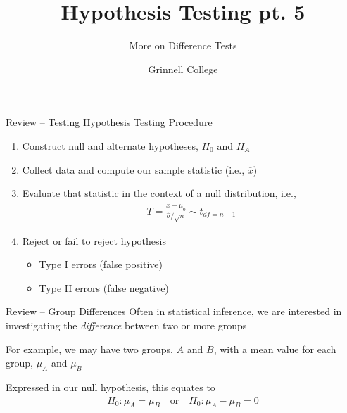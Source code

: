 \documentclass{beamer}
\title[Introduction to Statistics]{Hypothesis Testing pt. 5}
\subtitle{More on Difference Tests}
\author{Grinnell College}
\date{}
\begin{document}
\begin{frame}
  \titlepage
\end{frame}

\begin{frame}{Review -- Testing}
Hypothesis Testing Procedure
\begin{enumerate}
\item Construct null and alternate hypotheses, $H_0$ and $H_A$
\item Collect data and compute our sample statistic (i.e., $\overline{x}$)
\item Evaluate that statistic in the context of a null distribution, i.e., 
\begin{align*}
T = \frac{\overline{x} - \mu_0}{\hat{\sigma}/\sqrt{n}} \sim t_{df=n-1}
\end{align*}
\item Reject or fail to reject hypothesis
\begin{itemize}
\item Type I errors (false positive)
\item Type II errors (false negative)
\end{itemize}
\end{enumerate}
\end{frame}

\begin{frame}{Review -- Group Differences}
Often in statistical inference, we are interested in investigating the \textit{difference} between two or more groups \vspace{4mm}

For example, we may have two groups, $A$ and $B$, with a mean value for each group, $\mu_A$ and $\mu_B$ \\ \vspace{4mm}

Expressed in our null hypothesis, this equates to
\begin{align*}
H_0: \mu_A = \mu_B \quad \text{or} \quad H_0: \mu_A - \mu_B = 0
\end{align*}
\end{frame}
\end{document}
